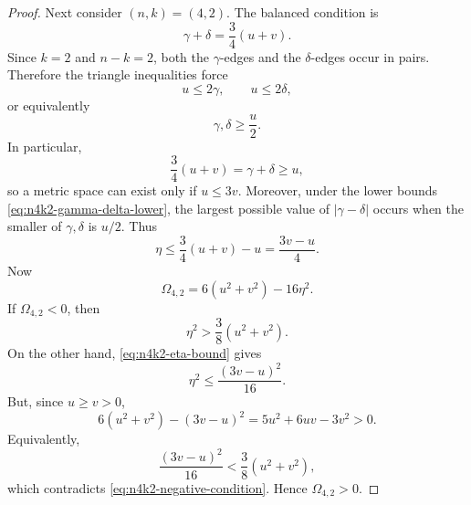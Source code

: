 \documentclass[10pt,a4paper]{amsart}
\begin{document}
\begin{proof}
Next consider \((n,k)=(4,2)\).  The balanced condition is
\begin{equation}\label{eq:n4k2-balanced-sum}
\gamma+\delta=\frac{3}{4}(u+v).
\end{equation}
Since \(k=2\) and \(n-k=2\), both the \(\gamma\)-edges and the
\(\delta\)-edges occur in pairs.  Therefore the triangle inequalities force
\begin{equation}\label{eq:n4k2-lower-bounds}
u\leq 2\gamma,
\qquad
u\leq 2\delta,
\end{equation}
or equivalently
\begin{equation}\label{eq:n4k2-gamma-delta-lower}
\gamma,\delta\geq \frac{u}{2}.
\end{equation}
In particular,
\begin{equation}\label{eq:n4k2-necessary}
\frac{3}{4}(u+v)=\gamma+\delta\geq u,
\end{equation}
so a metric space can exist only if \(u\leq 3v\).  Moreover, under the lower
bounds \eqref{eq:n4k2-gamma-delta-lower}, the largest possible value of
\(|\gamma-\delta|\) occurs when the smaller of \(\gamma,\delta\) is \(u/2\).
Thus
\begin{equation}\label{eq:n4k2-eta-bound}
\eta
\leq
\frac{3}{4}(u+v)-u
=
\frac{3v-u}{4}.
\end{equation}
Now
\begin{equation}\label{eq:n4k2-Omega}
\Omega_{4,2}=6(u^2+v^2)-16\eta^2.
\end{equation}
If \(\Omega_{4,2}<0\), then
\begin{equation}\label{eq:n4k2-negative-condition}
\eta^2>\frac{3}{8}(u^2+v^2).
\end{equation}
On the other hand, \eqref{eq:n4k2-eta-bound} gives
\begin{equation}\label{eq:n4k2-upper-square}
\eta^2\leq \frac{(3v-u)^2}{16}.
\end{equation}
But, since \(u\geq v>0\),
\begin{equation}\label{eq:n4k2-elementary-positive}
6(u^2+v^2)-(3v-u)^2
=
5u^2+6uv-3v^2
>0.
\end{equation}
Equivalently,
\begin{equation}\label{eq:n4k2-contradiction}
\frac{(3v-u)^2}{16}
<
\frac{3}{8}(u^2+v^2),
\end{equation}
which contradicts \eqref{eq:n4k2-negative-condition}.  Hence
\(\Omega_{4,2}>0\).


\end{proof}
\end{document}
